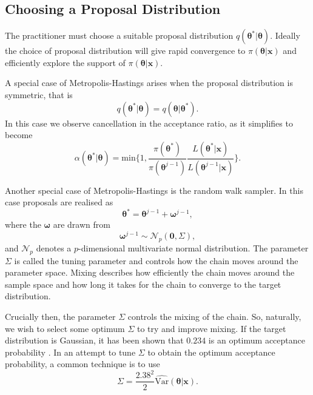 \subsection*{Choosing a Proposal Distribution}
\label{ssec:proposal_distribution}
The practitioner must choose a suitable proposal distribution $q(\bm{\theta}^*|\bm{\theta})$. Ideally the choice of proposal distribution will give rapid convergence to $\pi(\bm{\theta}|\bm{x})$ and efficiently explore the support of $\pi(\bm{\theta}|\bm{x})$.

A special case of Metropolis-Hastings arises when the proposal distribution is symmetric, that is
\begin{equation*}
	q(\bm{\theta}^*|\bm{\theta}) = q(\bm{\theta}|\bm{\theta}^*).
\end{equation*}
In this case we observe cancellation in the acceptance ratio, as it simplifies to become 
\begin{equation*}
	\alpha({\bm{\theta}}^*|\bm{\theta}) = \text{min}\bigg\{ 1, \frac{\pi({\bm{\theta}}^*)}{\pi({\bm{\theta}}^{j-1})} \frac{L(\bm{\theta}^*|\bm{x})}{L({\bm{\theta}}^{j-1}|\bm{x})} \bigg\}.
\end{equation*}

Another special case of Metropolis-Hastings is the random walk sampler. In this case proposals are realised as
\begin{equation*}
	\bm{\theta}^* = \bm{\theta}^{j-1} + \bm{\omega}^{j-1},
\end{equation*}
where the $\bm{\omega}$ are drawn from
\begin{equation*}
	\bm{\omega}^{j-1} \sim \mathcal{N}_p(\bm{0}, \Sigma),
\end{equation*}
and $\mathcal{N}_p$ denotes a $p$-dimensional multivariate normal distribution. The parameter $\Sigma$ is called the tuning parameter and controls how the chain moves around the parameter space. Mixing describes how efficiently the chain moves around the sample space and how long it takes for the chain to converge to the target distribution.

Crucially then, the parameter $\Sigma$ controls the mixing of the chain. So, naturally, we wish to select some optimum $\Sigma$ to try and improve mixing. If the target distribution is Gaussian, it has been shown that $0.234$ is an optimum acceptance probability \citep{roberts01}. In an attempt to tune $\Sigma$ to obtain the optimum acceptance probability, a common technique is to use 
\begin{equation*}
	\Sigma = \frac{2.38^2}{2} \widehat{\text{Var}}(\bm{\theta}|\bm{x}).
\end{equation*}


